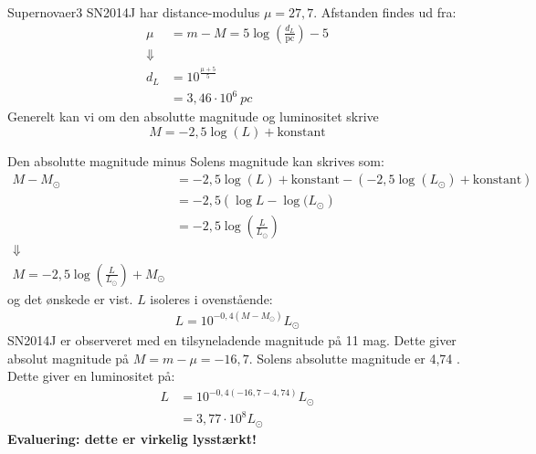 \begin{opgave}{Supernovaer}{3}
\opg SN2014J har distance-modulus $\mu=27,7$. Afstanden findes ud fra:
\begin{align*}
\mu &= m - M = 5\log\left( \frac{d_L}{\text{pc}} \right) - 5 \\
\Downarrow & \\
d_L &= 10^{\frac{\mu + 5}{5}} \\
&=  3,46 \cdot 10^6~\si{pc}
\end{align*}
\opg Generelt kan vi om den absolutte magnitude og luminositet skrive
\begin{equation}
M = -2,5 \log (L) + \text{konstant}
\end{equation}

Den absolutte magnitude minus Solens magnitude kan skrives som:
\begin{align*}
M - M_\odot &= -2,5\log (L) + \text{konstant} - (-2,5\log (L_\odot) + \text{konstant}) \\
&=-2,5 \left( \log{L} - \log(L_\odot \right) \\
&= -2,5 \log \left( \frac{L}{L_\odot} \right) \\
\Downarrow & \\
M = -2,5 \log \left( \frac{L}{L_\odot} \right) + M_\odot
\end{align*}
og det ønskede er vist.
\opg $L$ isoleres i ovenstående:
\begin{align*}
L = 10^{-0,4(M-M_\odot)} L_\odot
\end{align*}
\opg SN2014J er observeret med en tilsyneladende magnitude på 11 mag.  Dette giver absolut magnitude på $M = m - \mu = -16,7$. 
Solens absolutte magnitude er 4,74 . Dette giver en luminositet på:
\begin{align*}
L &= 10^{-0,4(-16,7-4,74)} L_\odot \\
&= 3,77 \cdot 10^8  L_\odot
\end{align*} 
\textbf{Evaluering: dette er virkelig lysstærkt!}
\end{opgave}




